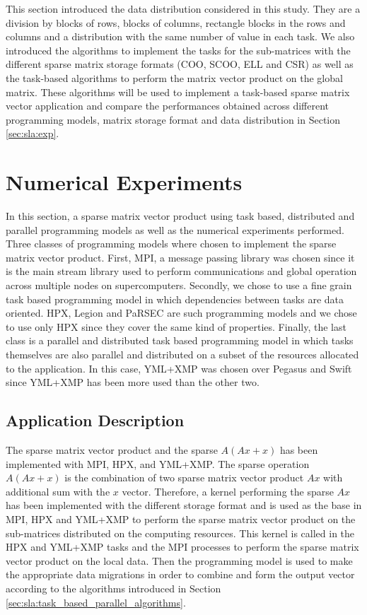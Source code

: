 This section introduced the data distribution considered in this study.
They are a division by blocks of rows, blocks of columns, rectangle blocks in the rows and columns and a distribution with the same number of value in each task.
We also introduced the algorithms to implement the tasks for the sub-matrices with the different sparse matrix storage formats (COO, SCOO, ELL and CSR) as well as the task-based algorithms to perform the matrix vector product on the global matrix.
These algorithms will be used to implement a task-based sparse matrix vector application and compare the performances obtained across different programming models, matrix storage format and data distribution in Section \ref{sec:sla:exp}.

\section{Numerical Experiments \label{sec:sla:exp}}
In this section, a sparse matrix vector product using task based, distributed and parallel programming models as well as the numerical experiments performed.
Three classes of programming models where chosen to implement the sparse matrix vector product.
First, MPI, a message passing library was chosen since it is the main stream library used to perform communications and global operation across multiple nodes on supercomputers.
Secondly, we chose to use a fine grain task based programming model in which dependencies between tasks are data oriented.
HPX, Legion and PaRSEC are such programming models and we chose to use only HPX since they cover the same kind of properties.
Finally, the last class is a parallel and distributed task based programming model in which tasks themselves are also parallel and distributed on a subset of the resources allocated to the application.
In this case, YML+XMP was chosen over Pegasus and Swift since YML+XMP has been more used than the other two.

\subsection{Application Description}
The sparse matrix vector product and the sparse $A(Ax+x)$ has been implemented with MPI, HPX, and YML+XMP.
The sparse operation $A(Ax+x)$ is the combination of two sparse matrix vector product $Ax$ with additional sum with the $x$ vector.
Therefore, a kernel performing the sparse $Ax$ has been implemented with the different storage format and is used as the base in MPI, HPX and YML+XMP to perform the sparse matrix vector product on the sub-matrices distributed on the computing resources.
This kernel is called in the HPX and YML+XMP tasks and the MPI processes to perform the sparse matrix vector product on the local data.
Then the programming model is used to make the appropriate data migrations in order to combine and form the output vector according to the algorithms introduced in Section \ref{sec:sla:task_based_parallel_algorithms}.

